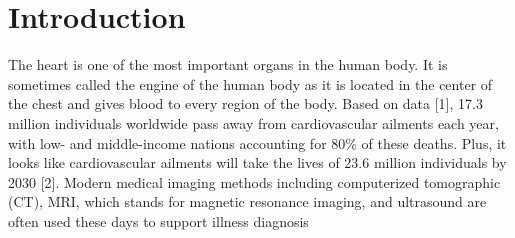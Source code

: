 \documentclass[runningheads]{llncs}
\begin{document}
\section{Introduction}
The heart is one of the most important organs in the human body. It is sometimes called the engine of the human body as it is located in the center of the chest and gives blood to every region of the body. Based on data [1], 17.3 million individuals worldwide pass away from cardiovascular ailments each year, with low- and middle-income nations accounting for 80\% of these deaths. Plus, it looks like cardiovascular ailments will take the lives of 23.6 million individuals by 2030 [2]. Modern medical imaging methods including computerized tomographic (CT), MRI, which stands for magnetic resonance imaging, and ultrasound are often used these days to support illness diagnosis
\end{document}
